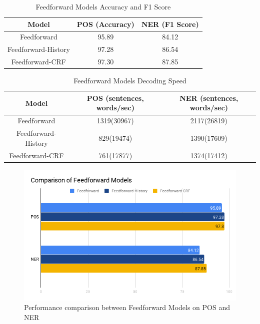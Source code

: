 \begin{table}[]
\centering
\caption{Feedforward Models Accuracy and F1 Score}
\label{table:ff-table1}
\begin{tabular}{|c|c|c|}
\hline
Model         & POS (Accuracy)  & NER (F1 Score)       \\ \hline
Feedforward    & 95.89          &   84.12     \\ \hline
Feedforward-History & 97.28     & 86.54        \\ \hline
Feedforward-CRF     & 97.30          &   87.85     \\ \hline
\end{tabular}
\end{table}

\begin{table}[]
\centering
\caption{Feedforward Models Decoding Speed}
\label{table:ff-tabel2}
\begin{tabular}{|c|c|c|}
\hline
Model       & POS  (sentences, words/sec)  & NER  (sentences, words/sec)      \\ \hline
Feedforward    & 1319(30967)     & 2117(26819)    \\ \hline
Feedforward-History & 829(19474)     & 1390(17609)     \\ \hline
Feedforward-CRF    & 761(17877)     & 1374(17412)     \\ \hline
\end{tabular}
\end{table}

\begin{figure}
  \centering
  \includegraphics[scale=0.6]{ffbar.png}
 \caption{Performance comparison between Feedforward Models on POS and NER}
  \label{fig:ff}
\end{figure}

